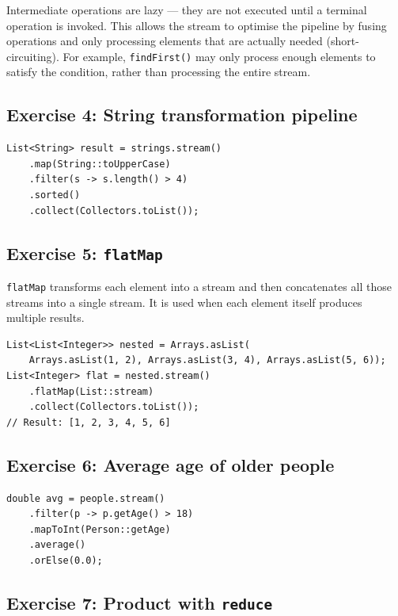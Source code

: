 \documentclass[twoside=false,DIV=14]{scrartcl}
\begin{document}
Intermediate operations are lazy --- they are not executed until a terminal operation is invoked.  This allows the stream to optimise the pipeline by fusing operations and only processing elements that are actually needed (short-circuiting).  For example, \texttt{findFirst()} may only process enough elements to satisfy the condition, rather than processing the entire stream.

\subsection*{Exercise 4: String transformation pipeline}

\begin{lstlisting}
List<String> result = strings.stream()
    .map(String::toUpperCase)
    .filter(s -> s.length() > 4)
    .sorted()
    .collect(Collectors.toList());
\end{lstlisting}

\subsection*{Exercise 5: \texttt{flatMap}}

\texttt{flatMap} transforms each element into a stream and then concatenates all those streams into a single stream.  It is used when each element itself produces multiple results.

\begin{lstlisting}
List<List<Integer>> nested = Arrays.asList(
    Arrays.asList(1, 2), Arrays.asList(3, 4), Arrays.asList(5, 6));
List<Integer> flat = nested.stream()
    .flatMap(List::stream)
    .collect(Collectors.toList());
// Result: [1, 2, 3, 4, 5, 6]
\end{lstlisting}

\subsection*{Exercise 6: Average age of older people}

\begin{lstlisting}
double avg = people.stream()
    .filter(p -> p.getAge() > 18)
    .mapToInt(Person::getAge)
    .average()
    .orElse(0.0);
\end{lstlisting}

\subsection*{Exercise 7: Product with \texttt{reduce}}
\end{document}
